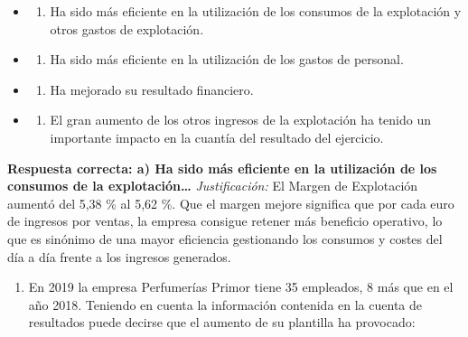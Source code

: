 \documentclass[12pt]{book} %
\providecommand{\tightlist}{%
  \setlength{\itemsep}{0pt}\setlength{\parskip}{0pt}}
\begin{document}
\begin{itemize}
\item
  \begin{enumerate}
  \def\labelenumi{\alph{enumi})}
  \tightlist
  \item
    Ha sido más eficiente en la utilización de los consumos de la
    explotación y otros gastos de explotación.
  \end{enumerate}
\item
  \begin{enumerate}
  \def\labelenumi{\alph{enumi})}
  \setcounter{enumi}{1}
  \tightlist
  \item
    Ha sido más eficiente en la utilización de los gastos de personal.
  \end{enumerate}
\item
  \begin{enumerate}
  \def\labelenumi{\alph{enumi})}
  \setcounter{enumi}{2}
  \tightlist
  \item
    Ha mejorado su resultado financiero.
  \end{enumerate}
\item
  \begin{enumerate}
  \def\labelenumi{\alph{enumi})}
  \setcounter{enumi}{3}
  \tightlist
  \item
    El gran aumento de los otros ingresos de la explotación ha tenido un
    importante impacto en la cuantía del resultado del ejercicio.
  \end{enumerate}
\end{itemize}

\textbf{Respuesta correcta: a) Ha sido más eficiente en la utilización
de los consumos de la explotación\ldots{}} \emph{Justificación:} El
Margen de Explotación aumentó del 5,38 \% al 5,62 \%. Que el margen
mejore significa que por cada euro de ingresos por ventas, la empresa
consigue retener más beneficio operativo, lo que es sinónimo de una
mayor eficiencia gestionando los consumos y costes del día a día frente
a los ingresos generados.

\begin{enumerate}
\def\labelenumi{\arabic{enumi}.}
\setcounter{enumi}{7}
\tightlist
\item
  En 2019 la empresa Perfumerías Primor tiene 35 empleados, 8 más que en
  el año 2018. Teniendo en cuenta la información contenida en la cuenta
  de resultados puede decirse que el aumento de su plantilla ha
  provocado:
\end{enumerate}
\end{document}
